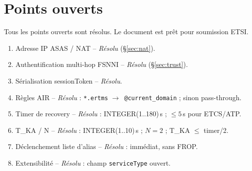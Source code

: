 \documentclass[11pt,a4paper]{article}
\newcommand{\arr}{$\to$}
\begin{document}
\section{Points ouverts}

Tous les points ouverts sont résolus. Le document est prêt pour soumission ETSI.

\begin{enumerate}[leftmargin=2em]
  \item[\st{1.}] Adresse IP ASAS / NAT -- \textit{Résolu} (§\ref{sec:nat}).
  \item[\st{2.}] Authentification multi-hop FSNNI -- \textit{Résolu} (§\ref{sec:trust}).
  \item[\st{3.}] Sérialisation sessionToken -- \textit{Résolu}.
  \item[\st{4.}] Règles AIR -- \textit{Résolu} : \texttt{*.ertms}
    \arr\ \texttt{@current\_domain} ; sinon pass-through.
  \item[\st{5.}] Timer de recovery -- \textit{Résolu} :
    INTEGER(1..180)\,s ; $\leq 5$\,s pour ETCS/ATP.
  \item[\st{6.}] T\_KA / N -- \textit{Résolu} :
    INTEGER(1..10)\,s ; $N=2$ ; T\_KA $\leq$ timer/2.
  \item[\st{7.}] Déclenchement liste d'alias -- \textit{Résolu} : immédiat, sans FROP.
  \item[\st{8.}] Extensibilité -- \textit{Résolu} : champ \texttt{serviceType} ouvert.
\end{enumerate}
\end{document}
